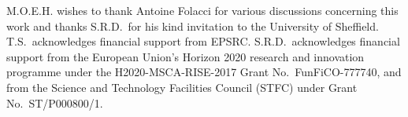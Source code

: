 \documentclass[aps,prd,longbibliography,reprint,twocolumn,amsmath,amssymb,amsfonts,showpacs,footnote,superscriptaddress]{revtex4-1}%
\begin{document}
\acknowledgments
M.O.E.H. wishes to thank Antoine Folacci for various discussions concerning this work and thanks S.R.D.~for his kind
invitation to the University of Sheffield. T.S.~acknowledges financial support from EPSRC. S.R.D.~acknowledges financial support from the European Union's Horizon 2020 research and innovation programme under the H2020-MSCA-RISE-2017 Grant No.~FunFiCO-777740, and from the Science and Technology Facilities Council (STFC) under Grant No.~ST/P000800/1.





\end{document}
